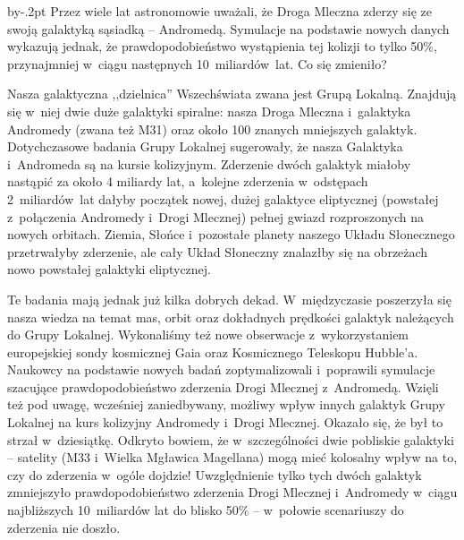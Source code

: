 \def\xhref#1#2{\href{#1}{\hskip16pt}\llap{#2}}
\def\xxhref#1#2{\href{#1}{\hskip14pt}\llap{#2}}
\makeatletter
\def\@oddhead{\hfill}
\def\@evenhead{\hfill}
\makeatother
   
   
\normalsize





\vspace*{.6\parskip}%
\begin{dwieszpalty}\advance\baselineskip by-.2pt
  Przez wiele lat astronomowie uważali, że Droga Mleczna
zderzy się ze swoją galaktyką sąsiadką
--  Andromedą. Symulacje na podstawie nowych danych wykazują jednak, że prawdopodobieństwo wystąpienia tej kolizji to tylko 50$\%$, przynajmniej w~ciągu następnych 10~miliardów~lat. Co się zmieniło?

Nasza galaktyczna ,,dzielnica'' Wszechświata zwana jest Grupą Lokalną. Znajdują się w~niej dwie duże galaktyki spiralne: nasza Droga Mleczna i~galaktyka Andromedy (zwana też M31) oraz około 100 znanych mniejszych galaktyk.  Dotychczasowe badania Grupy Lokalnej sugerowały, że nasza Galaktyka i~Andromeda są na kursie kolizyjnym. Zderzenie dwóch galaktyk miałoby nastąpić za około 4 miliardy lat, a~kolejne zderzenia w~odstępach 2~miliardów~lat dałyby początek nowej, dużej galaktyce eliptycznej (powstałej z~połączenia Andromedy i~Drogi Mlecznej) pełnej gwiazd rozproszonych na nowych orbitach. Ziemia, Słońce i~pozostałe planety naszego Układu Słonecznego przetrwałyby zderzenie, ale cały Układ Słoneczny znalazłby się na obrzeżach nowo powstałej galaktyki eliptycznej. 

Te badania mają jednak już kilka dobrych dekad. W~międzyczasie poszerzyła się nasza wiedza na temat mas, orbit oraz dokładnych prędkości galaktyk należących do Grupy Lokalnej. Wykonaliśmy też nowe obserwacje z~wykorzystaniem europejskiej sondy kosmicznej Gaia oraz Kosmicznego Teleskopu Hubble'a. Naukowcy na podstawie nowych badań %
zoptymalizowali i~poprawili symulacje szacujące prawdopodobieństwo zderzenia Drogi Mlecznej z~Andromedą. Wzięli też pod uwagę, wcześniej zaniedbywany, możliwy wpływ innych galaktyk Grupy Lokalnej na kurs kolizyjny Andromedy i~Drogi Mlecznej. Okazało się, że był to strzał w~dziesiątkę. Odkryto bowiem, że w~szczególności dwie pobliskie galaktyki -- satelity (M33 i~Wielka Mgławica Magellana) mogą mieć kolosalny wpływ na to, czy do zderzenia w~ogóle dojdzie! Uwzględnienie tylko tych dwóch galaktyk zmniejszyło prawdopodobieństwo zderzenia Drogi Mlecznej i~Andromedy w~ciągu najbliższych 10~miliardów lat do blisko 50$\%$ -- w~połowie scenariuszy do zderzenia nie doszło.


\end{dwieszpalty}
